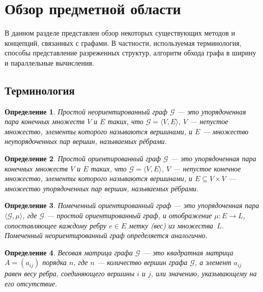 
\section{Обзор предметной области}

В данном разделе представлен обзор некоторых существующих методов и концепций, связанных с графами. В частности, используемая терминология, способы представление разреженных структур, алгоритм обхода графа в ширину и параллельные вычисления.

\subsection{Терминология}

\newtheorem{definition}{Определение}
\newtheorem*{remark}{Замечание}

\begin{definition}
Простой неориентированный граф $\mathcal{G}$ --- это упорядоченная пара конечных множеств $V$ и $E$ таких, что $\mathcal{G} = \langle V, E \rangle$, $V$ --- непустое множество, элементы которого называются вершинами, и $E$ --- множество неупорядоченных пар вершин, называемых рёбрами.
\end{definition}

\begin{definition}
Простой ориентированный граф $\mathcal{G}$ --- это упорядоченная пара  конечных множеств $V$ и $E$ таких, что $\mathcal{G} = \langle V, E \rangle$,  $V$ --- непустое конечное множество, элементы которого называются вершинами, и $E \subseteq V \times V$ --- множество упорядоченных пар вершин, называемых рёбрами.
\end{definition}

\begin{definition}
Помеченный ориентированный граф --- это упорядоченная пара $\langle \mathcal{G}, \mu \rangle$, где $\mathcal{G}$ --- простой ориентированный граф, и отображение $\mu: E \rightarrow L$, сопоставляющее каждому ребру $e \in E$ метку (вес) из множества~$L$. Помеченный неориентированный граф определяется аналогично.
\end{definition}

\begin{definition}
Весовая матрица графа $\mathcal{G}$ --- это квадратная матрица $A = (a_{ij})$ порядка $n$, где $n$ --- количество вершин графа $\mathcal{G}$, а элемент $a_{ij}$ равен весу ребра, соединяющего вершины $i$ и $j$, или значению, указывающему на его отсутствие.
\end{definition}

